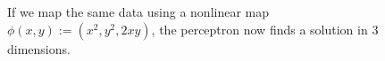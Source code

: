 \begin{figure}
\centering
    \caption{If we map the same data using a nonlinear map $\phi(x,y):= (x^2, y^2, 2xy)$, the perceptron now finds a solution
             in 3 dimensions.}
    \label{fig:fmapped}
\end{figure} 